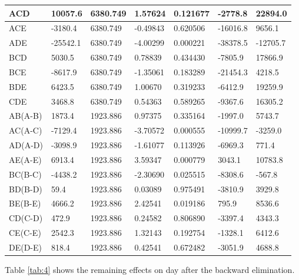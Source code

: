 \documentclass[materials,article,submit,pdftex,moreauthors]{Definitions/mdpi}
\begin{document}
\begin{ThreePartTable}
\begin{footnotesize}
\begin{longtable}{|l|l|l|l|l|l|l|}
        ACD & 10057.6 & 6380.749 & 1.57624 & 0.121677 & -2778.8 & 22894.0 \\ \hline
        ACE & -3180.4 & 6380.749 & -0.49843 & 0.620506 & -16016.8 & 9656.1 \\ \hline
        \rowcolor{LightCyan}
        ADE & -25542.1 & 6380.749 & -4.00299 & 0.000221 & -38378.5 & -12705.7 \\ \hline
        BCD & 5030.5 & 6380.749 & 0.78839 & 0.434430 & -7805.9 & 17866.9 \\ \hline
        BCE & -8617.9 & 6380.749 & -1.35061 & 0.183289 & -21454.3 & 4218.5 \\ \hline
        BDE & 6423.5 & 6380.749 & 1.00670 & 0.319233 & -6412.9 & 19259.9 \\ \hline
        CDE & 3468.8 & 6380.749 & 0.54363 & 0.589265 & -9367.6 & 16305.2 \\ \hline
        AB(A-B) & 1873.4 & 1923.886 & 0.97375 & 0.335164 & -1997.0 & 5743.7 \\ \hline
        \rowcolor{LightCyan}
        AC(A-C) & -7129.4 & 1923.886 & -3.70572 & 0.000555 & -10999.7 & -3259.0 \\ \hline
        AD(A-D) & -3098.9 & 1923.886 & -1.61077 & 0.113926 & -6969.3 & 771.4 \\ \hline
        \rowcolor{LightCyan}
        AE(A-E) & 6913.4 & 1923.886 & 3.59347 & 0.000779 & 3043.1 & 10783.8 \\ \hline
        \rowcolor{LightCyan}
        BC(B-C) & -4438.2 & 1923.886 & -2.30690 & 0.025515 & -8308.6 & -567.8 \\ \hline
        BD(B-D) & 59.4 & 1923.886 & 0.03089 & 0.975491 & -3810.9 & 3929.8 \\ \hline
        \rowcolor{LightCyan}
        BE(B-E) & 4666.2 & 1923.886 & 2.42541 & 0.019186 & 795.9 & 8536.6 \\ \hline
        CD(C-D) & 472.9 & 1923.886 & 0.24582 & 0.806890 & -3397.4 & 4343.3 \\ \hline
        CE(C-E) & 2542.3 & 1923.886 & 1.32143 & 0.192754 & -1328.1 & 6412.6 \\ \hline
        DE(D-E) & 818.4 & 1923.886 & 0.42541 & 0.672482 & -3051.9 & 4688.8 \\ \hline
\end{longtable}
\end{footnotesize}
\end{ThreePartTable}

Table \ref{tab:4} shows the remaining effects on day  after the backward elimination. 
\end{document}
